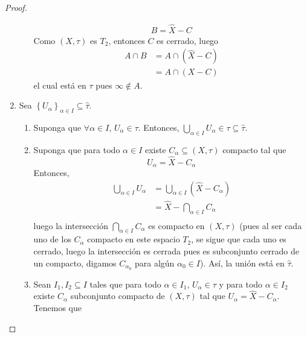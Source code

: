 \documentclass[12pt]{report}
\theoremstyle{largebreak}
\begin{document}
\begin{proof}
\begin{enumerate}
\begin{enumerate}
\begin{equation*}
                    \begin{split}
                        B=\hat{X}-C
                    \end{split}
                \end{equation*}
                Como $(X,\tau)$ es $T_2$, entonces $C$ es cerrado, luego
                \begin{equation*}
                    \begin{split}
                        A\cap B&=A\cap (\hat{X}-C)\\
                        &=A\cap (X-C)
                    \end{split}
                \end{equation*}
                el cual está en $\tau$ pues $\infty\notin A$.
            \end{enumerate}
            \item Sea $\left\{U_\alpha \right\}_{\alpha\in I}\subseteq\hat{\tau}$.
            \begin{enumerate}
                \item Suponga que $\forall \alpha\in I$, $U_\alpha\in \tau$. Entonces, $\bigcup_{\alpha\in I}U_\alpha\in\tau\subseteq\hat{\tau}$.
                \item Suponga que para todo $\alpha\in I$ existe $C_\alpha\subseteq (X,\tau)$ compacto tal que
                \begin{equation*}
                    U_\alpha=\hat{X}-C_\alpha
                \end{equation*}
                Entonces,
                \begin{equation*}
                    \begin{split}
                        \bigcup_{\alpha\in I}U_\alpha&=\bigcup_{\alpha\in I}(\hat{X}-C_\alpha)\\
                        &=\hat{X}-\bigcap_{\alpha\in I}C_\alpha\\
                    \end{split}
                \end{equation*}
                luego la intersección $\bigcap_{\alpha\in I}C_\alpha$ es compacto en $(X,\tau)$ (pues al ser cada uno de los $C_\alpha$ compacto en este espacio $T_2$, se sigue que cada uno es cerrado, luego la intersección es cerrada pues es subconjunto cerrado de un compacto, digamos $C_{\alpha_0}$ para algún $\alpha_0\in I$). Así, la unión está en $\hat{\tau}$.
                \item Sean $I_1,I_2\subseteq I$ tales que para todo $\alpha\in I_1$, $U_\alpha\in\tau$ y para todo $\alpha\in I_2$ existe $C_\alpha$ subconjunto compacto de $(X,\tau)$ tal que $U_\alpha=\hat{X}-C_\alpha$. Tenemos que

\end{enumerate}
\end{enumerate}
\end{proof}
\end{document}
